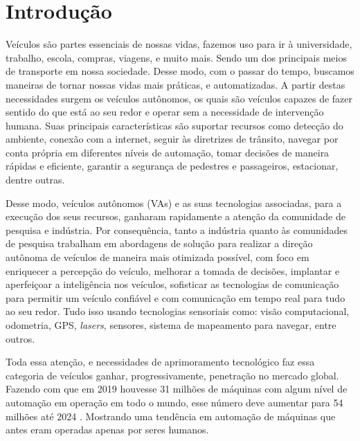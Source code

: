 \documentclass[
	12pt,				%
	openany, %
	a4paper,			%
	english,			%
	french,				%
	spanish,			%
	brazil				%
	]{abntex2}
\begin{document}
\chapter*[Introdução]{Introdução}


Veículos são partes essenciais de nossas vidas, fazemos uso para ir à universidade, trabalho, escola, compras, viagens, e muito mais. Sendo um dos principais meios de transporte em nossa sociedade.
Desse modo, com o passar do tempo, buscamos maneiras de tornar nossas vidas mais práticas, e automatizadas. A partir destas necessidades surgem os veículos autônomos, os quais são veículos capazes de fazer sentido do que está ao seu redor e operar sem a necessidade de intervenção humana. Suas principais características são suportar recursos como detecção do ambiente, conexão com a internet, seguir às diretrizes de trânsito, navegar por conta própria em diferentes níveis de automação, tomar decisões de maneira rápidas e eficiente, garantir a segurança de pedestres e passageiros, estacionar, dentre outras.

Desse modo, veículos autônomos (VAs) e as suas tecnologias associadas, para a execução dos seus recursos, ganharam rapidamente a atenção da comunidade de pesquisa e indústria. Por consequência, tanto a indústria quanto às comunidades de pesquisa trabalham em abordagens de solução para realizar a direção autônoma de veículos de maneira mais otimizada possível, com foco em enriquecer a percepção do veículo, melhorar a tomada de decisões, implantar e aperfeiçoar a inteligência nos veículos, sofisticar as tecnologias de comunicação para permitir um veículo confiável e com comunicação em tempo real para tudo ao seu redor. Tudo isso usando tecnologias sensoriais como: visão computacional, odometria, GPS, \textit{lasers}, sensores, sistema de mapeamento para navegar, entre outros.

Toda essa atenção, e necessidades de aprimoramento tecnológico faz essa categoria de veículos ganhar, progressivamente, penetração no mercado global. Fazendo com que em 2019 houvesse 31 milhões de máquinas com algum nível de automação em operação em todo o mundo, esse número deve aumentar para 54 milhões até 2024 \cite{sensors}. Mostrando uma tendência em automação de máquinas que antes eram operadas apenas por seres humanos.
\end{document}
